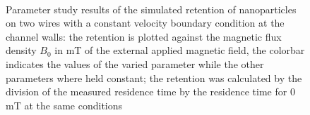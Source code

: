 \begin{figure}[h]
\begin{subfigure}{0.49\textwidth}
        \end{subfigure}
        \\       
          \caption[Parameter study results of the simulated retention of nanoparticles on two wires with a constant velocity boundary condition at the channel walls]{Parameter study results of the simulated retention of nanoparticles on two wires with a constant velocity boundary condition at the channel walls: the retention is plotted against the magnetic flux density $B_{0}$ in mT of the external applied magnetic field, the colorbar indicates the values of the varied parameter while the other parameters where held constant; the retention was calculated by the division of the measured residence time by the residence time for 0\,mT at the same conditions}
        \label{fig:tw_param_res_constBC}
  \end{figure}
        
